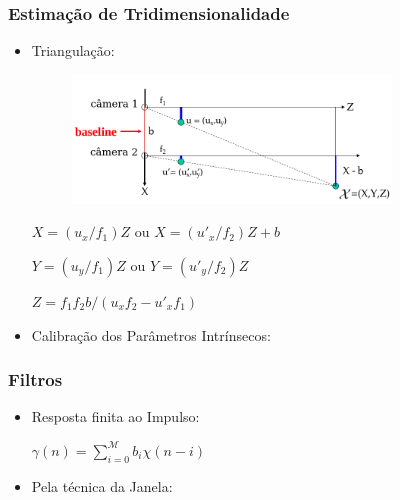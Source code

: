 \documentclass[brazil]{beamer}
\begin{document}
\begin{frame}
\frametitle{Estimação de Tridimensionalidade}
  \begin{itemize}
      \item Triangulação:
      
      \begin{figure}
        \centering
        \includegraphics[width = 0.8\textwidth, keepaspectratio]{./img/TG_triangulation_pdf_washington_pt2.png}
      \end{figure}
      
      $X = (u_x/f_1)  Z$ ou $ X = (u'_x/f_2)  Z + b $
      
      $Y = (u_y/f_1) Z$ ou $ Y = (u'_y/f_2) Z$
      
      $Z = f_1  f_2  b / (u_x  f_2 - u'_x  f_1)$
      
      \item Calibração dos Parâmetros Intrínsecos:
  \end{itemize} 
\end{frame}

\begin{frame}
\frametitle{Filtros}
  \begin{itemize}
      \item Resposta finita ao Impulso: 
      
      $\gamma(n) = 	\sum_{i=0}^{\mathcal{M}} b_i \chi(n-i)$
      
      \item Pela técnica da Janela: 
      

  \end{itemize} 
\end{frame}
\end{document}

